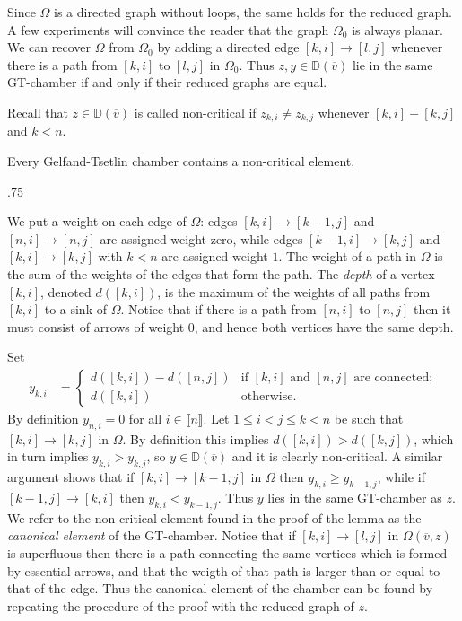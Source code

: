 \documentclass[11pt,fleqn]{amsart}
\makeatletter
\renewcommand\proofname{Proof}
\renewenvironment{proof}[1][\textit{\proofname}]{\par
 \pushQED{\qed}%
 \normalfont \topsep.75\paraskip\relax
 \trivlist
 \item[\hskip\labelsep
 \itshape
 #1\@addpunct{.}]\ignorespaces
}{%
 \popQED\endtrivlist\@endpefalse
}
\newcounter{para}[section]
\renewcommand\to{\longrightarrow}
\newcommand\vv{\overline{v}}
\newcommand\interval[1]{\llbracket #1 \rrbracket}
\newcommand\DD{\mathbb D}
\makeatother
\begin{document}
Since $\Omega$ is a directed graph without loops, the same holds for the 
reduced graph. A few experiments will convince the reader that the graph 
$\Omega_0$ is always planar. We can recover $\Omega$ from $\Omega_0$ by adding 
a directed edge $[k,i] \rightarrow [l,j]$ whenever there is a path from 
$[k,i]$ to $[l,j]$ in $\Omega_0$. Thus $z,y \in \DD(\vv)$ lie in the same 
GT-chamber if and only if their reduced graphs are equal. 

Recall that $z\in \DD(\vv)$ is called non-critical if $z_{k,i} \neq z_{k,j}$
whenever $[k,i] - [k,j]$ and $k<n$.
\begin{Lemma}
\label{L:canonical-element}
Every Gelfand-Tsetlin chamber contains a non-critical element.
\end{Lemma}
\begin{proof}
We put a weight on each edge of $\Omega$: edges $[k,i] \rightarrow [k-1,j]$ 
and $[n,i] \rightarrow [n,j]$ are assigned weight zero, while edges 
$[k-1,i] \rightarrow [k,j]$ and $[k,i] \rightarrow [k,j]$ with $k<n$ are 
assigned weight $1$. The weight of a path in $\Omega$ is the sum of the 
weights of the edges that form the path. The \emph{depth} of a vertex $[k,i]$, 
denoted $d([k,i])$, is the maximum of the weights of all paths from $[k,i]$ to 
a sink of $\Omega$. Notice that if there is a path from $[n,i]$ to $[n,j]$ 
then it must consist of arrows of weight $0$, and hence both vertices have the 
same depth. 

Set
\begin{align*}
y_{k,i}
	&= 
	\begin{cases}
	d([k,i]) - d([n,j]) 
		&\mbox{if $[k,i]$ and $[n,j]$ are connected;} \\
	d([k,i])
		&\mbox{otherwise.}
	\end{cases}
\end{align*}
By definition $y_{n,i} = 0$ for all $i \in \interval n$. Let $1 \leq i < j 
\leq k < n$ be such that $[k,i] \rightarrow [k,j]$ in $\Omega$. By definition 
this implies $d([k,i]) > d([k,j])$, which in turn implies $y_{k,i} > y_{k,j}$, 
so $y \in \DD(\vv)$ and it is clearly non-critical. A similar argument shows 
that if $[k,i] \rightarrow [k-1,j]$ in $\Omega$ then $y_{k,i} \geq y_{k-1,j}$, 
while if $[k-1,j] \rightarrow [k,i]$ then $y_{k,i} < y_{k-1,j}$. Thus $y$ lies 
in the same GT-chamber as $z$.
\end{proof}
We refer to the non-critical element found in the proof of the lemma as the
\emph{canonical element} of the GT-chamber.
Notice that if $[k,i] \to [l,j]$ in $\Omega(\vv,z)$ is superfluous then there 
is a path connecting the same vertices which is formed by essential arrows, 
and that the weigth of that path is larger than or equal to that of the edge.
Thus the canonical element of the chamber can be found by repeating the 
procedure of the proof with the reduced graph of $z$.
\end{document}
